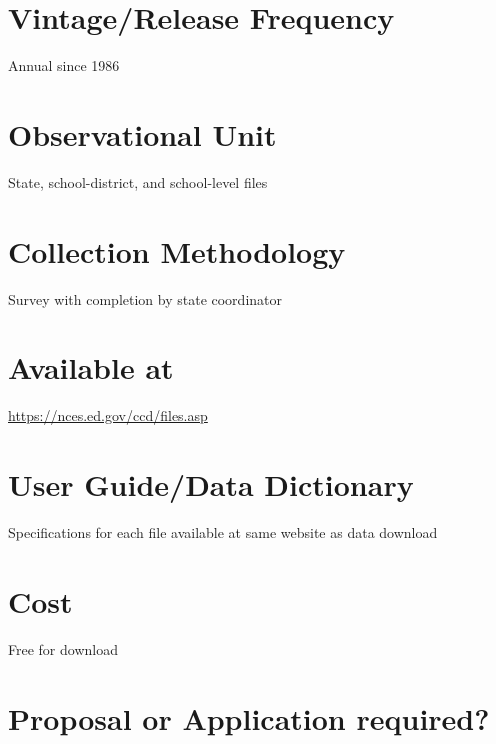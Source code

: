 \documentclass[
]{book}
\begin{document}
\hypertarget{vintagerelease-frequency-17}{%
\section{Vintage/Release Frequency}\label{vintagerelease-frequency-17}}

Annual since 1986

\hypertarget{observational-unit-17}{%
\section{Observational Unit}\label{observational-unit-17}}

State, school-district, and school-level files

\hypertarget{collection-methodology-17}{%
\section{Collection Methodology}\label{collection-methodology-17}}

Survey with completion by state coordinator

\hypertarget{available-at-17}{%
\section{Available at}\label{available-at-17}}

\url{https://nces.ed.gov/ccd/files.asp}

\hypertarget{user-guidedata-dictionary-17}{%
\section{User Guide/Data Dictionary}\label{user-guidedata-dictionary-17}}

Specifications for each file available at same website as data download

\hypertarget{cost-17}{%
\section{Cost}\label{cost-17}}

Free for download

\hypertarget{proposal-or-application-required-17}{%
\section{Proposal or Application required?}\label{proposal-or-application-required-17}}
\end{document}
